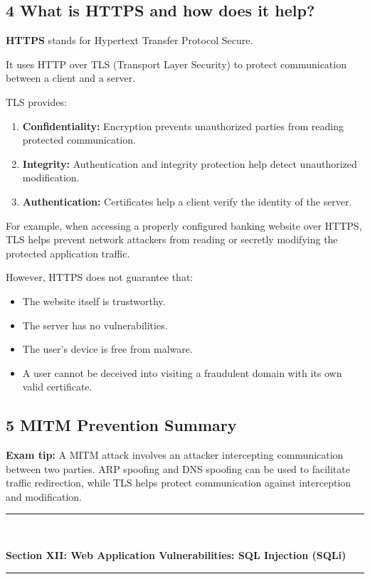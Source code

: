 \subsection{4 What is HTTPS and how does it help?}

\textbf{HTTPS} stands for Hypertext Transfer Protocol Secure.

It uses HTTP over TLS (Transport Layer Security) to protect communication between a client and a server.

TLS provides:

\begin{enumerate}
\item \textbf{Confidentiality:} Encryption prevents unauthorized parties from reading protected communication.
\item \textbf{Integrity:} Authentication and integrity protection help detect unauthorized modification.
\item \textbf{Authentication:} Certificates help a client verify the identity of the server.
\end{enumerate}

For example, when accessing a properly configured banking website over HTTPS, TLS helps prevent network attackers from reading or secretly modifying the protected application traffic.

However, HTTPS does not guarantee that:

\begin{itemize}
\item The website itself is trustworthy.
\item The server has no vulnerabilities.
\item The user's device is free from malware.
\item A user cannot be deceived into visiting a fraudulent domain with its own valid certificate.
\end{itemize}

\subsection{5 MITM Prevention Summary}


\textbf{Exam tip:} A MITM attack involves an attacker intercepting communication between two parties. ARP spoofing and DNS spoofing can be used to facilitate traffic redirection, while TLS helps protect communication against interception and modification.


\newpage
\begin{center}
\vspace{0.5em}
{\color{primary}\rule{0.45\textwidth}{1.2pt}\\[4pt]}
{\Large\bfseries\color{primary} Section XII: Web Application Vulnerabilities: SQL Injection (SQLi)\\[2pt]}
{\color{primary}\rule{0.45\textwidth}{1.2pt}}
\vspace{0.5em}
\end{center}

